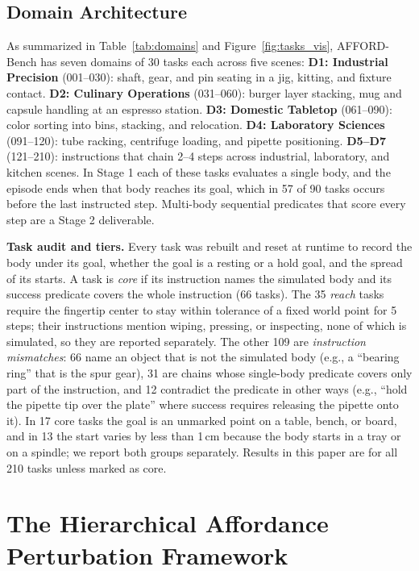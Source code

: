 \documentclass[conference]{IEEEtran}
\begin{document}
\subsection{Domain Architecture}
As summarized in Table~\ref{tab:domains} and Figure~\ref{fig:tasks_vis}, AFFORD-Bench has seven domains of 30 tasks each across five scenes:
\textbf{D1: Industrial Precision} (001--030): shaft, gear, and pin seating in a jig, kitting, and fixture contact.
\textbf{D2: Culinary Operations} (031--060): burger layer stacking, mug and capsule handling at an espresso station.
\textbf{D3: Domestic Tabletop} (061--090): color sorting into bins, stacking, and relocation.
\textbf{D4: Laboratory Sciences} (091--120): tube racking, centrifuge loading, and pipette positioning.
\textbf{D5--D7} (121--210): instructions that chain 2--4 steps across industrial, laboratory, and kitchen scenes. In Stage 1 each of these tasks evaluates a single body, and the episode ends when that body reaches its goal, which in 57 of 90 tasks occurs before the last instructed step. Multi-body sequential predicates that score every step are a Stage 2 deliverable.

\textbf{Task audit and tiers.} Every task was rebuilt and reset at runtime to record the body under its goal, whether the goal is a resting or a hold goal, and the spread of its starts. A task is \emph{core} if its instruction names the simulated body and its success predicate covers the whole instruction (66 tasks). The 35 \emph{reach} tasks require the fingertip center to stay within tolerance of a fixed world point for 5 steps; their instructions mention wiping, pressing, or inspecting, none of which is simulated, so they are reported separately. The other 109 are \emph{instruction mismatches}: 66 name an object that is not the simulated body (e.g., a ``bearing ring'' that is the spur gear), 31 are chains whose single-body predicate covers only part of the instruction, and 12 contradict the predicate in other ways (e.g., ``hold the pipette tip over the plate'' where success requires releasing the pipette onto it). In 17 core tasks the goal is an unmarked point on a table, bench, or board, and in 13 the start varies by less than 1\,cm because the body starts in a tray or on a spindle; we report both groups separately. Results in this paper are for all 210 tasks unless marked as core.

\section{The Hierarchical Affordance Perturbation Framework}
\label{sec:perturbations}
\end{document}

